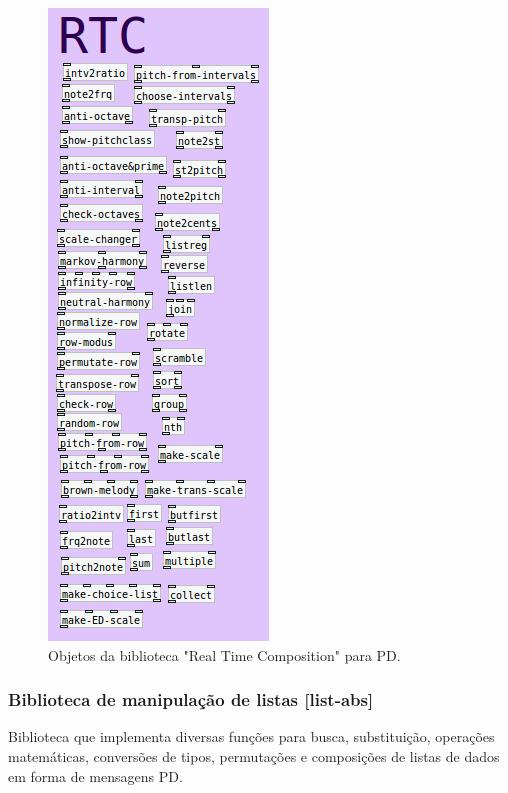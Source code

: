\documentclass[
	12pt,				%
	openright,			%
	twoside,			%
	a4paper,			%
	english,			%
	french,				%
	spanish,			%
	brazil				%
	]{abntex2}
\begin{document}
\begin{figure}[!h]
	\caption{\label{fig_grafico}Objetos da biblioteca "Real Time Composition" para PD.}
	\begin{center}
	    \includegraphics[scale=0.7]{OMPD/PD-RTC.png}
	\end{center}
\end{figure}

\subsubsection{Biblioteca de manipulação de listas [list-abs]}

Biblioteca que implementa diversas funções para busca, substituição, operações matemáticas, conversões de tipos, permutações e composições de listas de dados em forma de mensagens PD.
\end{document}
